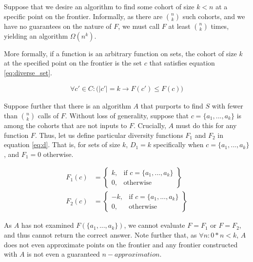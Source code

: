 Suppose that we desire an algorithm to find some cohort of size $k < n$ at a specific point on the frontier. Informally, as there are $n \choose k$ such cohorts, and we have no guarantees on the nature of $F$, we must call $F$ at least $n \choose k$ times, yielding an algorithm $\Omega(n^k)$.

More formally, if a function is an arbitrary function on sets, the cohort of size $k$ at the specified point on the frontier is the set $c$ that satisfies equation \ref{eq:diverse_set}. 

\begin{equation}
    \label{eq:diverse_set}
    \begin{split}
        \forall c' \in C : \bigl( |c'| = k \rightarrow  F(c') \leq F(c) \bigr)
    \end{split}
\end{equation}

Suppose further that there is an algorithm $A$ that purports to find $S$ with fewer than $n \choose k$ calls of $F$. Without loss of generality, suppose that $c = \{ a_1, ..., a_k \}$ is among the cohorts that are not inputs to $F$. Crucially, $A$ must do this for any function $F$. Thus, let us define particular diversity functions $F_1$ and $F_2$ in equation \ref{eq:d}. That is, for sets of size $k$, $D_1 = k$ specifically when $c = \{ a_1, ..., a_k \}$, and $F_1 = 0$ otherwise.

\begin{equation}
    \label{eq:d}
    \begin{split}
        F_1(c) &=
        \left\{
            \begin{array}{lr}
                k, & \text{if } c = \{ a_1, ..., a_k \}\\
                0, & \text{otherwise }
            \end{array}
        \right\} \\
        F_2(c) &=
        \left\{
            \begin{array}{lr}
                -k, & \text{if } c = \{ a_1, ..., a_k \}\\
                0, & \text{otherwise }
            \end{array}
        \right\}
    \end{split}
\end{equation}

As $A$ has not examined $F(\{ a_1, ..., a_k \})$, we cannot evaluate $F=F_1$ or $F=F_2$, and thus cannot return the correct answer. Note further that, as $\forall n : 0*n < k$, $A$ does not even approximate points on the frontier and any frontier constructed with $A$ is not even a guaranteed $n-approximation$.

